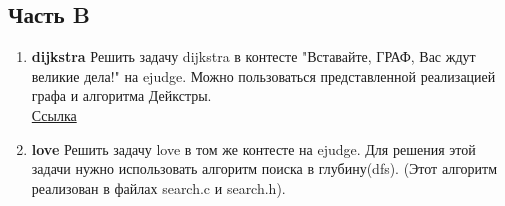 \documentclass[12pt]{article}
\begin{document}
\subsection*{Часть B}
\begin{enumerate}
\item \textbf{dijkstra} Решить задачу dijkstra в контесте "Вставайте, ГРАФ, Вас ждут великие дела!" на ejudge. Можно пользоваться представленной реализацией графа и алгоритма Дейкстры.\\
\href{http://93.175.29.68/cgi-bin/new-register?action=211&contest_id=500109}{Ссылка}
\item \textbf{love} Решить задачу love в том же контесте на ejudge. Для решения этой задачи нужно использовать алгоритм поиска в глубину(dfs). (Этот алгоритм реализован в файлах search.c и search.h).
\end{enumerate}
\end{document}
